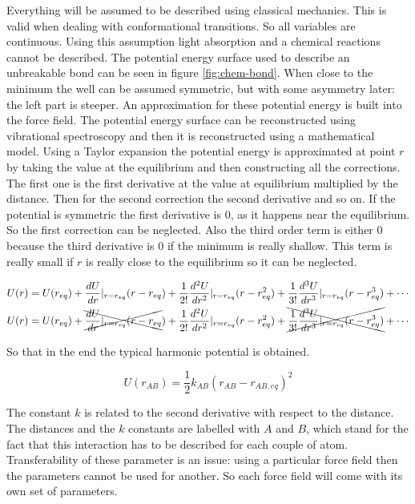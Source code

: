 	Everything will be assumed to be described using classical mechanics.
	This is valid when dealing with conformational transitions.
	So all variables are continuous.
	Using this assumption light absorption and a chemical reactions cannot be described.
	The potential energy surface used to describe an unbreakable bond can be seen in figure \ref{fig:chem-bond}.
	When close to the minimum the well can be assumed symmetric, but with some asymmetry later: the left part is steeper.
	An approximation for these potential energy is built into the force field.
	The potential energy surface can be reconstructed using vibrational spectroscopy and then it is reconstructed using a mathematical model.
	Using a Taylor expansion the potential energy is approximated at point $r$ by taking the value at the equilibrium and then constructing all the corrections.
	The first one is the first derivative at the value at equilibrium multiplied by the distance.
	Then for the second correction the second derivative and so on.
	If the potential is symmetric the first derivative is $0$, as it happens near the equilibrium.
	So the first correction can be neglected.
	Also the third order term is either $0$ because the third derivative is $0$ if the minimum is really shallow.
	This term is really small if $r$ is really close to the equilibrium so it can be neglected.

	\begin{align*}
		U(r)&=U(r_{eq}) + \frac{dU}{dr}|_{r=r_{eq}}(r-r_{eq})+\frac{1}{2!}\frac{d^2U}{dr^2}|_{r=r_{eq}}(r-r_{eq}^2)+\frac{1}{3!}\frac{d^3U}{dr^3}|_{r=r_{eq}}(r-r_{eq}^3)+\cdots\\
		U(r)&=U(r_{eq}) + \xcancel{\frac{dU}{dr}|_{r=r_{eq}}(r-r_{eq}})+\frac{1}{2!}\frac{d^2U}{dr^2}|_{r=r_{eq}}(r-r_{eq}^2)+\xcancel{\frac{1}{3!}\frac{d^3U}{dr^3}|_{r=r_{eq}}(r-r_{eq}^3)}+\cdots\\
	\end{align*}

	So that in the end the typical harmonic potential is obtained.

	$$U(r_{AB}) = \frac{1}{2}k_{AB}(r_{AB}-r_{AB,eq})^2$$

	The constant $k$ is related to the second derivative with respect to the distance.
	The distances and the $k$ constants are labelled with $A$ and $B$, which stand for the fact that this interaction has to be described for each couple of atom.
	Transferability of these parameter is an issue: using a particular force field then the parameters cannot be used for another.
	So each force field will come with its own set of parameters.

